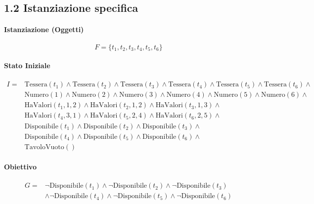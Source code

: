 \documentclass[a4paper,11pt]{article}
\begin{document}
\newpage

\subsection*{1.2 Istanziazione specifica}

\paragraph{Istanziazione (Oggetti)}
\[ F = \{ t_1, t_2, t_3, t_4, t_5, t_6 \} \]

\paragraph{Stato Iniziale}
\[
\begin{aligned}
I = & \text{Tessera}(t_1) \land \text{Tessera}(t_2) \land \text{Tessera}(t_3) \land \text{Tessera}(t_4) \land \text{Tessera}(t_5) \land \text{Tessera}(t_6) \land \\
& \text{Numero}(1) \land \text{Numero}(2) \land \text{Numero}(3) \land \text{Numero}(4) \land \text{Numero}(5) \land \text{Numero}(6) \land \\
& \text{HaValori}(t_1, 1, 2) \land \text{HaValori}(t_2, 1, 2) \land \text{HaValori}(t_3, 1, 3) \land \\
& \text{HaValori}(t_4, 3, 1) \land \text{HaValori}(t_5, 2, 4) \land \text{HaValori}(t_6, 2, 5) \land \\
& \text{Disponibile}(t_1) \land \text{Disponibile}(t_2) \land \text{Disponibile}(t_3) \land \\
& \text{Disponibile}(t_4) \land \text{Disponibile}(t_5) \land \text{Disponibile}(t_6) \land \\
& \text{TavoloVuoto}()
\end{aligned}
\]

\paragraph{Obiettivo}
\[
\begin{aligned}
G = & \neg \text{Disponibile}(t_1) \land \neg \text{Disponibile}(t_2) \land \neg \text{Disponibile}(t_3) \\
    & \land \neg \text{Disponibile}(t_4) \land \neg \text{Disponibile}(t_5) \land \neg \text{Disponibile}(t_6)
\end{aligned}
\]
\end{document}
